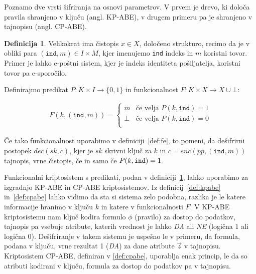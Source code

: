 \documentclass[12pt,a4paper,openany,tikz]{book}
\theoremstyle{plain}
\theoremstyle{definition}
\newtheorem{defn}[thm]{Definicija} %
\begin{document}
Poznamo dve vrsti šifriranja na osnovi parametrov. V prvem je drevo, ki določa pravila shranjeno v ključu  (angl. \acrlong{KP-ABE}), v drugem primeru pa je shranjeno v tajnopisu (angl. \acrlong{CP-ABE}).

\begin{mdframed}[frametitle={Funkcionalni kriptosistem s predikati}]
\begin{defn}
Velikokrat ima čistopis $x \in X$, določeno strukturo, recimo da je v obliki para $(\texttt{ind}, m) \in I \times M$, kjer imenujemo \texttt{ind} indeks in $m$ koristni tovor. Primer je lahko e-poštni sistem, kjer je indeks identiteta pošiljatelja, koristni tovor pa e-sporočilo.

Definirajmo predikat $P: K \times I \rightarrow {\{}0, 1{\}}$ in funkcionalnost $F: K \times X \rightarrow X \cup \bot$:

\begin{gather*}
F(k, (\texttt{ind}, m)) = \begin{cases}
m & \text{če velja } P(k, \texttt{ind}) = 1\\
\bot & \text{če velja } P(k, \texttt{ind}) = 0\\
\end{cases}
\end{gather*}

Če tako funkcionalnost uporabimo v definiciji~\ref{def:fe}, to pomeni, da dešifrirni postopek $dec(sk, c)$, kjer je $sk$ skrivni ključ za $k$ in $c = enc(pp, (\texttt{ind}, m))$ tajnopis, vrne čistopis, če in samo če $P(k, \text{\texttt{ind}})=1$.

\label{def:fepredicate}
\end{defn}
\end{mdframed}

Funkcionalni kriptosistem s predikati, podan v definiciji~\ref{def:fepredicate}, lahko uporabimo za izgradnjo KP-ABE in CP-ABE kriptosistemov. Iz definicij~\ref{def:kpabe} in~\ref{def:cpabe} lahko vidimo da sta si sistema zelo podobna, razlika je le katere informacije hranimo v ključu $k$ in katere v funkcionalnosti $F$. V KP-ABE kriptosistemu nam ključ kodira formulo $\phi$ (pravilo) za dostop do podatkov, tajnopis pa vsebuje atribute, katerih vrednost je lahko \textit{DA} ali \textit{NE} (logična $1$ ali logična $0$). Dešifriranje v takem sistemu je uspešno le v primeru, da formula, podana v ključu, vrne rezultat 1 (\textit{DA}) za dane atribute $\vec{z}$ v tajnopisu. Kriptosistem CP-ABE, definiran v \ref{def:cpabe}, uporablja enak princip, le da so atributi kodirani v ključu, formula za dostop do podatkov pa v tajnopisu.
\end{document}
